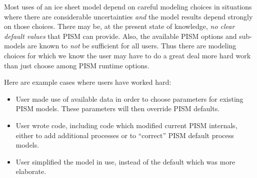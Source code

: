 Most uses of an ice sheet model depend on careful modeling choices in situations where there are considerable uncertainties \emph{and} the model results depend strongly on those choices.  There may be, at the present state of knowledge, \emph{no clear default values} that PISM can provide.  Also, the available PISM options and sub-models are known to \emph{not} be sufficient for all users.  Thus there are modeling choices for which we know the user may have to do a great deal more hard work than just choose among PISM runtime options.

Here are example cases where users have worked hard:
\begin{itemize}
\item User made use of available data in order to choose parameters for existing PISM models.  These parameters will then override PISM defaults.
\begin{center} %
\end{center}
\item User wrote code, including code which modified current PISM internals, either to add additional processes or to ``correct'' PISM default process models.
\begin{center} %
\end{center}
\item User simplified the model in use, instead of the default which was more elaborate.
\begin{center} %
\end{center}
\end{itemize}




